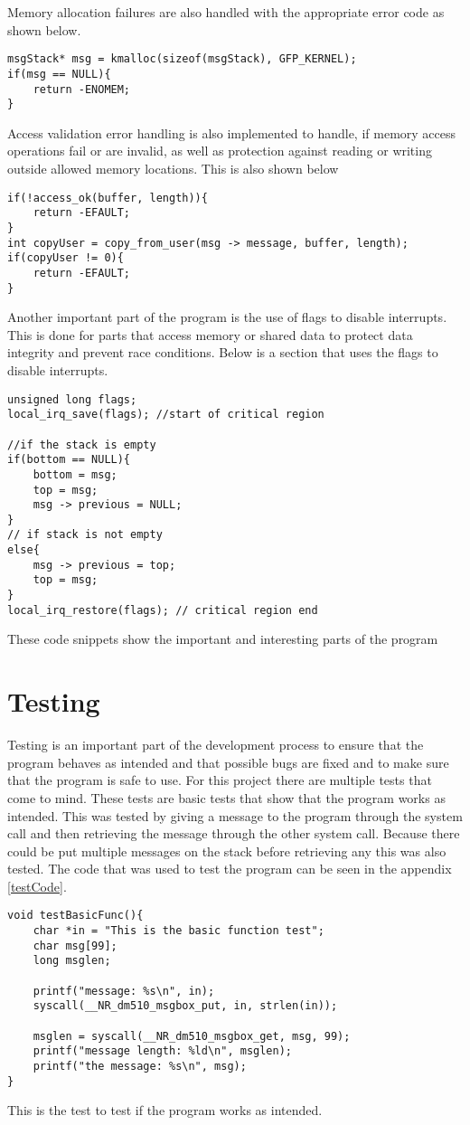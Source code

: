 \documentclass[12pt,a4paper]{report}
\begin{document}
Memory allocation failures are also handled with the appropriate error code as shown below.
\begin{verbatim}
msgStack* msg = kmalloc(sizeof(msgStack), GFP_KERNEL);
if(msg == NULL){
    return -ENOMEM;
}
\end{verbatim}
Access validation error handling is also implemented to handle, if memory access operations fail or are invalid, as well as protection against reading or writing outside allowed memory locations. This is also shown below
\begin{verbatim}
if(!access_ok(buffer, length)){
    return -EFAULT;
}
int copyUser = copy_from_user(msg -> message, buffer, length);
if(copyUser != 0){
    return -EFAULT;
}
\end{verbatim}
Another important part of the program is the use of flags to disable interrupts. This is done for parts that access memory or shared data to protect data integrity and prevent race conditions. Below is a section that uses the flags to disable interrupts.
\begin{verbatim}
unsigned long flags;
local_irq_save(flags); //start of critical region

//if the stack is empty
if(bottom == NULL){
    bottom = msg;
    top = msg;
    msg -> previous = NULL;
}
// if stack is not empty
else{
    msg -> previous = top;
    top = msg;
}
local_irq_restore(flags); // critical region end
\end{verbatim}

These code snippets show the important and interesting parts of the program


\section{Testing}
Testing is an important part of the development process to ensure that the program behaves as intended and that possible bugs are fixed and to make sure that the program is safe to use. For this project there are multiple tests that come to mind. These tests are basic tests that show that the program works as intended. This was tested by giving a message to the program through the system call and then retrieving the message through the other system call. Because there could be put multiple messages on the stack before retrieving any this was also tested. The code that was used to test the program can be seen in the appendix \ref{testCode}. 
\begin{verbatim}
void testBasicFunc(){
    char *in = "This is the basic function test";
    char msg[99];
    long msglen;

    printf("message: %s\n", in);
    syscall(__NR_dm510_msgbox_put, in, strlen(in));

    msglen = syscall(__NR_dm510_msgbox_get, msg, 99);
    printf("message length: %ld\n", msglen);
    printf("the message: %s\n", msg);
}
\end{verbatim}
This is the test to test if the program works as intended.
\end{document}
